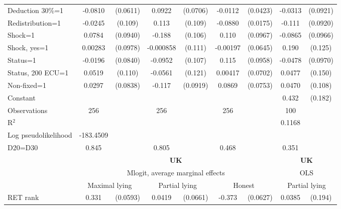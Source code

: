 \begin{tabular}{l|cccccc|cc}
Deduction 30\%=1&  -0.0810         & (0.0611)&   0.0922         & (0.0706)&  -0.0112         & (0.0423)&  -0.0313         & (0.0921)\\
Redistribution=1&  -0.0245         &  (0.109)&    0.113         &  (0.109)&  -0.0880\sym{***}& (0.0175)&   -0.111         & (0.0920)\\
Shock=1         &   0.0784         & (0.0940)&   -0.188\sym{*}  &  (0.106)&    0.110         & (0.0967)&  -0.0865         & (0.0966)\\
Shock, yes=1    &  0.00283         & (0.0978)&-0.000858         &  (0.111)& -0.00197         & (0.0645)&    0.190         &  (0.125)\\
Status=1        &  -0.0196         & (0.0840)&  -0.0952         &  (0.107)&    0.115         & (0.0958)&  -0.0478         & (0.0970)\\
Status, 200 ECU=1&   0.0519         &  (0.110)&  -0.0561         &  (0.121)&  0.00417         & (0.0702)&   0.0477         &  (0.150)\\
Non-fixed=1     &   0.0297         & (0.0838)&   -0.117         & (0.0919)&   0.0869         & (0.0753)&   0.0470         &  (0.108)\\
Constant        &                  &         &                  &         &                  &         &    0.432\sym{**} &  (0.182)\\
\hline
Observations    &      256         &         &      256         &         &      256         &         &      100         &         \\
R$^2$      &                  &         &                  &         &                  &         &          0.1168  &   \\ 
Log pseudolikelihood  & -183.4509   &         &                  &         &                  &         &           &   \\ 
D20=D30         &    0.845         &         &    0.805         &         &    0.468         &         &    0.351         &         \\
\hline\hline
&\multicolumn{6}{c|}{\bf UK}&\multicolumn{2}{c}{\bf UK}\\ &\multicolumn{6}{c|}{Mlogit, average marginal effects }&\multicolumn{2}{c}{OLS}\\
                &\multicolumn{2}{c}{Maximal lying}&\multicolumn{2}{c}{Partial lying}&\multicolumn{2}{c}{Honest}  &\multicolumn{2}{c}{Partial lying}\\
\hline
RET rank        &    0.331\sym{***}& (0.0593)&   0.0419         & (0.0661)&   -0.373\sym{***}& (0.0627)&   0.0385         &  (0.194)\\

\end{tabular}
